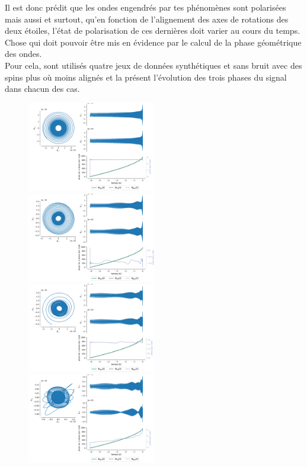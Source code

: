 \begin{figure}[h]
	
\end{figure}

Il est donc prédit que les ondes engendrés par tes phénomènes sont polarisées mais aussi et surtout, qu'en fonction de l'alignement des axes de rotations des deux étoiles, l'état de polarisation de ces dernières doit varier au cours du temps. Chose qui doit pouvoir être mis en évidence par le calcul de la phase géométrique des ondes.
\\

Pour cela, sont utilisés quatre jeux de données synthétiques et sans bruit avec des spins plus où moins alignés et la  présent l’évolution des trois phases du signal dans chacun des cas.
\\
\begin{figure}[h]
	\includegraphics[width=0.5\textwidth]{fig/part-3/GW_plot_1.pdf}\hfill
	\includegraphics[width=0.5\textwidth]{fig/part-3/GW_plot_2.pdf}\\
	\includegraphics[width=0.5\textwidth]{fig/part-3/GW_plot_3.pdf}\hfill
	\includegraphics[width=0.5\textwidth]{fig/part-3/GW_plot_4.pdf}

\end{figure}
